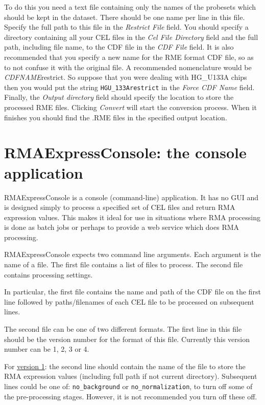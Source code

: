 \documentclass[11pt]{report}
\begin{document}
To do this you need a text file containing only the names of the probesets which should be kept in the dataset. There should be one name per line in this file. Specify the full path to this file in the {\it Restrict File} field. You should  specify a directory containing all your CEL files in the {\it Cel File Directory} field and the full path, including file name, to the CDF file in the {\it CDF File} field. It is also recommended that you specify a new name for the RME format CDF file, so as to not confuse it with the original file. A recommended nomenclature would be {\it CDFNAME}restrict. So suppose that you were dealing with HG\_U133A chips then you would put the string {\tt HGU\_133Arestrict} in the  {\it Force CDF Name} field. Finally, the {\it Output directory} field should specify the location to store the processed RME files.  Clicking {\it Convert} will start the conversion process. When it finishes you should find the .RME files in the specified output location. 


\chapter{RMAExpressConsole: the console application} \label{chap:RMAExpressConsole}

RMAExpressConsole is a console (command-line) application. It has no GUI and is designed simply to process a specified set of CEL files and return RMA expression values. This makes it ideal for use in situations where RMA processing is done as batch jobs or perhaps to provide a web service which does RMA processing.

RMAExpressConsole expects two command line arguments. Each argument is the name of a file. The first file contains a list of files to process. The second file contains processing settings.

In particular, the first file contains the name and path of the CDF file on the first line followed by paths/filenames of each CEL file to be processed on subsequent lines.

The second file can be one of two different formats. The first line in this file should be the version number for the format of this file. Currently this version number can be 1, 2, 3 or 4. 

For \underline{version 1}: the second line should contain the name of the file to store the RMA expression values (including full path if not current directory). Subsequent lines could be one of: {\tt no\_background} or {\tt no\_normalization}, to turn off some of the pre-processing stages. However, it is not recommended you turn off these off.
\end{document}
